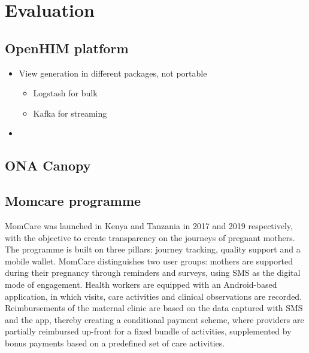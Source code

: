 \documentclass[
  authoryear]{elsarticle}
\providecommand{\tightlist}{%
  \setlength{\itemsep}{0pt}\setlength{\parskip}{0pt}}\usepackage{longtable,booktabs,array}
\begin{document}
\section{Evaluation}\label{evaluation}

\subsection{OpenHIM platform}\label{openhim-platform}

\begin{itemize}
\tightlist
\item
  View generation in different packages, not portable

  \begin{itemize}
  \tightlist
  \item
    Logstash for bulk
  \item
    Kafka for streaming
  \end{itemize}
\item
\end{itemize}

\subsection{ONA Canopy}\label{ona-canopy}

\subsection{Momcare programme}\label{momcare-programme}

MomCare was launched in Kenya
\citep{huisman2022digital, sanctis2022maintaining} and Tanzania
\citep{shija2021access, mrema2021application} in 2017 and 2019
respectively, with the objective to create transparency on the journeys
of pregnant mothers. The programme is built on three pillars: journey
tracking, quality support and a mobile wallet. MomCare distinguishes two
user groups: mothers are supported during their pregnancy through
reminders and surveys, using SMS as the digital mode of engagement.
Health workers are equipped with an Android-based application, in which
visits, care activities and clinical observations are recorded.
Reimbursements of the maternal clinic are based on the data captured
with SMS and the app, thereby creating a conditional payment scheme,
where providers are partially reimbursed up-front for a fixed bundle of
activities, supplemented by bonus payments based on a predefined set of
care activities.
\end{document}

